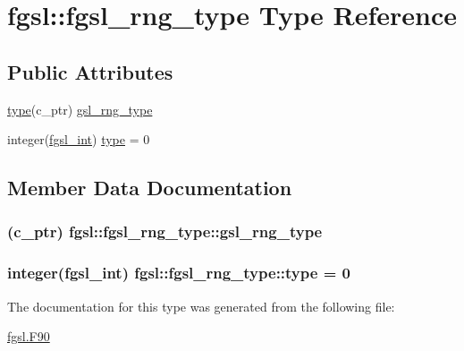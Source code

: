 \hypertarget{structfgsl_1_1fgsl__rng__type}{\section{fgsl\-:\-:fgsl\-\_\-rng\-\_\-type Type Reference}
\label{structfgsl_1_1fgsl__rng__type}
}
\subsection*{Public Attributes}
\begin{DoxyCompactItemize}
\item 
\hyperlink{structfgsl_1_1fgsl__rng__type_a124544a893fbccaf500ab420de1dfa6b}{type}(c\-\_\-ptr) \hyperlink{structfgsl_1_1fgsl__rng__type_a0511dd9837684ef4e599160873f28d7d}{gsl\-\_\-rng\-\_\-type}
\item 
integer(\hyperlink{classfgsl_a222deda1d7a0c0e845ce4a683318efeb}{fgsl\-\_\-int}) \hyperlink{structfgsl_1_1fgsl__rng__type_a124544a893fbccaf500ab420de1dfa6b}{type} = 0
\end{DoxyCompactItemize}


\subsection{Member Data Documentation}
\hypertarget{structfgsl_1_1fgsl__rng__type_a0511dd9837684ef4e599160873f28d7d}{
\subsubsection[{gsl\-\_\-rng\-\_\-type}]{(c\-\_\-ptr) fgsl\-::fgsl\-\_\-rng\-\_\-type\-::gsl\-\_\-rng\-\_\-type}}\label{structfgsl_1_1fgsl__rng__type_a0511dd9837684ef4e599160873f28d7d}
\hypertarget{structfgsl_1_1fgsl__rng__type_a124544a893fbccaf500ab420de1dfa6b}{
\subsubsection[{type}]{\setlength{\rightskip}{0pt plus 5cm}integer({\bf fgsl\-\_\-int}) fgsl\-::fgsl\-\_\-rng\-\_\-type\-::type = 0}}\label{structfgsl_1_1fgsl__rng__type_a124544a893fbccaf500ab420de1dfa6b}


The documentation for this type was generated from the following file\-:\begin{DoxyCompactItemize}
\item 
\hyperlink{fgsl_8F90}{fgsl.\-F90}\end{DoxyCompactItemize}
